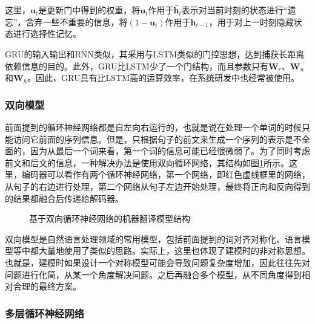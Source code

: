 \noindent 这里，$\mathbf{u}_t$是更新门中得到的权重，将$\mathbf{u}_t$作用于$\hat{\mathbf{h}}_t$表示对当前时刻的状态进行``遗忘''，舍弃一些不重要的信息，将$(1-\mathbf{u}_t)$作用于$\mathbf{h}_{t-1}$，用于对上一时刻隐藏状态进行选择性记忆。

\parinterval GRU的输入输出和RNN类似，其采用与LSTM类似的门控思想，达到捕获长距离依赖信息的目的。此外，GRU比LSTM少了一个门结构，而且参数只有$\mathbf{W}_r$、$\mathbf{W}_u$和$\mathbf{W}_h$。因此，GRU具有比LSTM高的运算效率，在系统研发中也经常被使用。


\subsubsection{双向模型}

\parinterval 前面提到的循环神经网络都是自左向右运行的，也就是说在处理一个单词的时候只能访问它前面的序列信息。但是，只根据句子的前文来生成一个序列的表示是不全面的，因为从最后一个词来看，第一个词的信息可能已经很微弱了。为了同时考虑前文和后文的信息，一种解决办法是使用双向循环网络，其结构如图\ref{fig:6-18}所示。这里，编码器可以看作有两个循环神经网络，第一个网络，即红色虚线框里的网络，从句子的右边进行处理，第二个网络从句子左边开始处理，最终将正向和反向得到的结果都融合后传递给解码器。

\begin{figure}[htp]
\centering

\caption{基于双向循环神经网络的机器翻译模型结构}
\label{fig:6-18}
\end{figure}

\parinterval 双向模型是自然语言处理领域的常用模型，包括前面提到的词对齐对称化、语言模型等中都大量地使用了类似的思路。实际上，这里也体现了建模时的非对称思想。也就是，建模时如果设计一个对称模型可能会导致问题复杂度增加，因此往往先对问题进行化简，从某一个角度解决问题。之后再融合多个模型，从不同角度得到相对合理的最终方案。


\subsubsection{多层循环神经网络}

